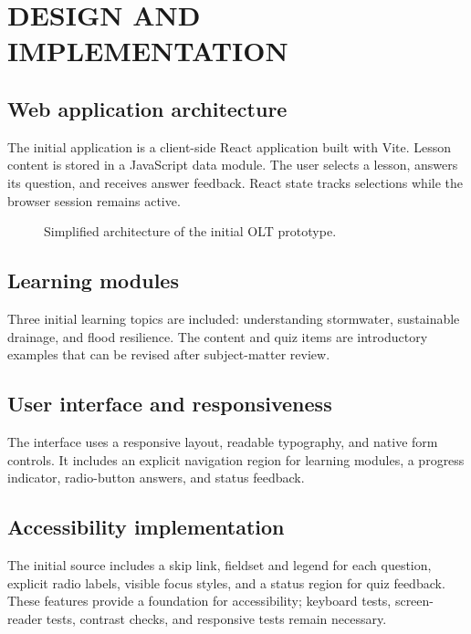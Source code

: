 \chapter{DESIGN AND IMPLEMENTATION}
\section{Web application architecture}
The initial application is a client-side React application built with Vite. Lesson content is stored in a JavaScript data module. The user selects a lesson, answers its question, and receives answer feedback. React state tracks selections while the browser session remains active.

\begin{figure}[htbp]
\centering
{}
\caption{Simplified architecture of the initial OLT prototype.}
\label{fig:architecture}
\end{figure}

\section{Learning modules}
Three initial learning topics are included: understanding stormwater, sustainable drainage, and flood resilience. The content and quiz items are introductory examples that can be revised after subject-matter review.

\section{User interface and responsiveness}
The interface uses a responsive layout, readable typography, and native form controls. It includes an explicit navigation region for learning modules, a progress indicator, radio-button answers, and status feedback.

\section{Accessibility implementation}
The initial source includes a skip link, fieldset and legend for each question, explicit radio labels, visible focus styles, and a status region for quiz feedback. These features provide a foundation for accessibility; keyboard tests, screen-reader tests, contrast checks, and responsive tests remain necessary.

